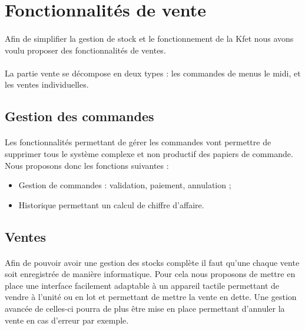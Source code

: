 \documentclass[twoside,UTF8]{EPURapport}
\begin{document}
    \section{Fonctionnalités de vente}
        
        \paragraph{}Afin de simplifier la gestion de stock et le fonctionnement de la Kfet nous avons voulu proposer des fonctionnalités de ventes. 

        \paragraph{}La partie vente se décompose en deux types : les commandes de menus le midi, et les ventes individuelles.

        \subsection{Gestion des commandes}
            \paragraph{}Les fonctionnalités permettant de gérer les commandes vont permettre de supprimer tous le système complexe et non productif des papiers de commande. Nous proposons donc les fonctions suivantes :
        
            \begin{itemize}
                \item Gestion de commandes : validation, paiement, annulation ;\\                
                \item Historique permettant un calcul de chiffre d'affaire.
            \end{itemize}

        \subsection{Ventes}
            \paragraph{}Afin de pouvoir avoir une gestion des stocks complète il faut qu'une chaque vente soit enregistrée de manière informatique. Pour cela nous proposons de mettre en place une interface facilement adaptable à un appareil tactile permettant de vendre à l'unité ou en lot et permettant de mettre la vente en dette. Une gestion avancée de celles-ci pourra de plus être mise en place permettant d'annuler la vente en cas d'erreur par exemple.
\end{document}
